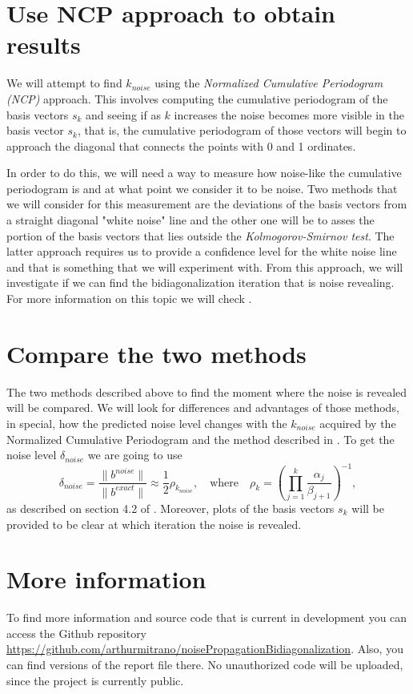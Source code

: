 \documentclass[11pt]{amsart}
\begin{document}
\section{Use NCP approach to obtain results}
We will attempt to find $k_{noise}$ using the \emph{Normalized Cumulative Periodogram (NCP)} approach.
This involves computing the cumulative periodogram of the basis vectors $s_k$ and seeing if as $k$ 
increases the noise becomes more visible in the basis vector $s_k$, that is, the cumulative periodogram
of those vectors will begin to approach the diagonal that connects the points with 0 and 1 ordinates.
 
In order to do this, we will need a way to measure how noise-like the cumulative periodogram is and at
what point we consider it to be noise. Two methods that we will consider for this measurement are the
deviations of the basis vectors from a straight diagonal "white noise" line and the other one will be
to asses the portion of the basis vectors that lies outside the \emph{Kolmogorov-Smirnov test}. 
The latter approach requires us to provide a confidence level for the white noise line and that is
something that we will experiment with. From this approach, we will investigate if we can find the
bidiagonalization iteration that is noise revealing. For more information on this topic we will check
\cite{periodograms}.


\section{Compare the two methods}
The two methods described above to find the moment where the noise is revealed will be compared. We will look
for differences and advantages of those methods, in special, how the predicted noise level changes with the 
$k_{noise}$ acquired by the Normalized Cumulative Periodogram and the method described in \cite{bidiagonalization}.
To get the noise level $\delta_{noise}$ we are going to use 
\begin{equation*}
	\delta_{noise} = \frac{\|b^{noise}\|}{\|b^{exact}\|} \approx \frac{1}{2}\rho_{k_{noise}}, \quad \text{where}
	\quad \rho_{k} = \left(\prod_{j=1}^k\frac{\alpha_j}{\beta_{j+1}}\right)^{-1},
\end{equation*}
as described on section 4.2 of \cite{bidiagonalization}.
Moreover, plots of the basis vectors $s_k$ will be provided to be clear at which iteration the noise is
revealed.

\section{More information}
\begin{sloppypar}
To find more information and source code that is current in development you can access the Github repository
\url{https://github.com/arthurmitrano/noisePropagationBidiagonalization}. Also, you can find 
versions of the report file there. No unauthorized code will be uploaded, since the project is currently
public.
\end{sloppypar}
\end{document}
